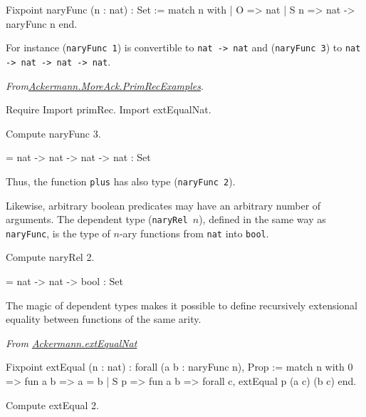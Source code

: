 \begin{Coqsrc}
Fixpoint naryFunc (n : nat) : Set :=
  match n with
  | O => nat
  | S n => nat -> naryFunc n
  end.
\end{Coqsrc}

For instance (\texttt{naryFunc 1}) is convertible to \texttt{nat -> nat} and (\texttt{naryFunc 3})
to \texttt{nat -> nat -> nat -> nat}.

\vspace{4pt}
\noindent
\emph{From\href{../theories/html/hydras.Ackermann.MoreAck.PrimRecExamples.html}{Ackermann.MoreAck.PrimRecExamples}}.
\begin{Coqsrc}
Require Import primRec.
Import extEqualNat.

Compute naryFunc 3.
\end{Coqsrc}

\begin{Coqanswer}
= nat -> nat -> nat -> nat
  : Set  
\end{Coqanswer}

Thus, the function \texttt{plus} has also type (\texttt{naryFunc 2}).

Likewise, arbitrary boolean predicates may have an arbitrary number of arguments. The dependent type
(\texttt{naryRel $n$}), defined in the same way as \texttt{naryFunc}, is the type of $n$-ary functions from
\texttt{nat} into \texttt{bool}.

\begin{Coqsrc}
Compute naryRel 2.
\end{Coqsrc}

\begin{Coqanswer}
 = nat -> nat -> bool
     : Set
\end{Coqanswer}

The magic of dependent types makes it possible to define recursively extensional equality between functions of the same arity.

\vspace{4pt}
\noindent
\emph{From \href{../theories/html/hydras.Ackermann.extEqualNat.html}{Ackermann.extEqualNat}}
\begin{Coqsrc}
Fixpoint  extEqual (n : nat) : forall  (a b : naryFunc n), Prop :=
  match n with
    0 => fun a b => a = b
  | S p => fun a b => forall c, extEqual p (a c) (b c)
  end.
\end{Coqsrc}

\begin{Coqsrc}
Compute extEqual 2.
\end{Coqsrc}

